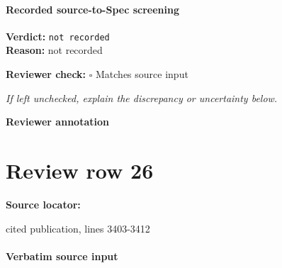 \documentclass[10pt]{article}
\newcommand{\reviewerbox}{%
  \par\noindent\fbox{\parbox{0.96\linewidth}{\rule{0pt}{0.38in}}}\par
}
\newcommand{\reviewmatch}[1]{%
  \par\noindent\textbf{Reviewer check:} $\square$\; #1\par
  \noindent\emph{If left unchecked, explain the discrepancy or uncertainty below.}\par
}
\begin{document}
\paragraph{Recorded source-to-Spec screening}
\textbf{Verdict:} \texttt{not recorded}
\\
\textbf{Reason:} not recorded
\reviewmatch{Matches source input}
\noindent\textbf{Reviewer annotation}\par
\reviewerbox
\clearpage
\hypertarget{source-claim-090419aeb8d7a8b0}{}
\section*{Review row 26}
\textbf{Source locator:} {\footnotesize\raggedright cited publication, lines 3403-\allowbreak{}3412\par}
\paragraph{Verbatim source input}
\end{document}
